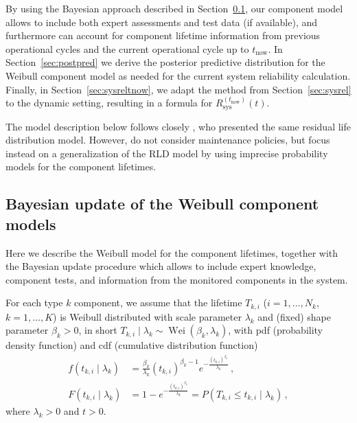 \documentclass[authoryear]{elsarticle}
\newcommand{\wei}{\operatorname{Wei}} %
\def\tnow{t_\text{now}}
\newcommand{\Rsysnow}{R^{(t_\text{now})}_\text{sys}}
\begin{document}
By using the Bayesian approach described in Section~\ref{sec:weibull},
our component model allows to include both expert assessments and test data (if available),
and furthermore can account for component lifetime information from previous operational cycles
and the current operational cycle up to $\tnow$.
%
In Section~\ref{sec:postpred} we derive the posterior predictive distribution
for the Weibull component model as needed for the current system reliability calculation.
Finally, in Section~\ref{sec:sysreltnow}, we adapt the method from Section~\ref{sec:sysrel} to the dynamic setting,
resulting in a formula for $\Rsysnow(t)$.

The model description below follows closely \cite[\S 2, \S 4.1 -- \S 4.3]{2016:walter-coolen},
who presented the same residual life distribution model.
However, \cite{2016:walter-coolen} do not consider maintenance policies,
but focus instead on a generalization of the RLD model by using imprecise probability models for the component lifetimes.


\subsection{Bayesian update of the Weibull component models}
\label{sec:weibull}

Here we describe the Weibull model for the component lifetimes,
together with the Bayesian update procedure which allows to include
expert knowledge, component tests, and information from the monitored components in the system.

For each type $k$ component, we assume that the lifetime $T_{k,i}$ ($i=1,\ldots,N_k$, $k = 1, \ldots, K$)
is Weibull distributed with scale parameter $\lambda_k$ and (fixed) shape parameter $\beta_k > 0$,
in short $T_{k,i} \mid \lambda_k \sim \wei(\beta_k,\lambda_k)$,
with pdf (probability density function) and cdf (cumulative distribution function)
\begin{align}
\label{eq:weibulldens}
f(t_{k,i} \mid \lambda_k) &= \frac{\beta_k}{\lambda_k} (t_{k,i})^{\beta_k-1} e^{-\frac{(t_{k,i})^{\beta_k}}{\lambda_k}}\,, \\
\label{eq:weibullcdf}
F(t_{k,i} \mid \lambda_k) &= 1 - e^{-\frac{(t_{k,i})^{\beta_k}}{\lambda_k}} = P(T_{k,i} \leq t_{k,i} \mid \lambda_k)\,,
\end{align}
where $\lambda_k > 0$ and $t > 0$.
\end{document}
